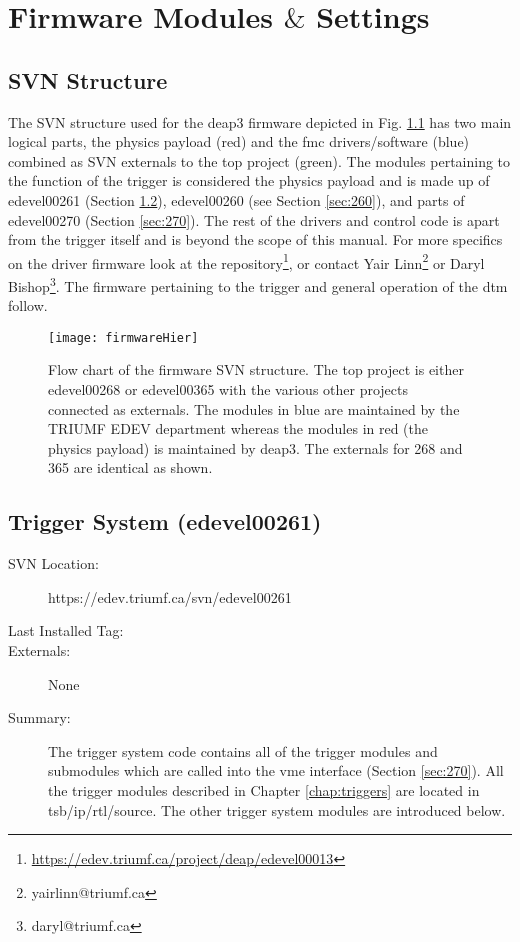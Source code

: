 \chapter{Firmware Modules $\&$ Settings}
\label{chap:firmware}

\section{SVN Structure}

The SVN structure used for the \gls{deap3} firmware depicted in Fig. \ref{Fig:firmHier} has two main logical parts, the physics payload (red) and the \gls{fmc} drivers/software (blue) combined as SVN externals to the top project (green). 
The modules pertaining to the function of the trigger is considered the physics payload and is made up of  edevel00261 (Section \ref{sec:261}), edevel00260 (see Section \ref{sec:260}), and parts of edevel00270 (Section \ref{sec:270}). 
The rest of the drivers and control code is apart from the trigger itself and is beyond the scope of this manual. 
For more specifics on the driver firmware look at the repository\footnote{\url{https://edev.triumf.ca/project/deap/edevel00013}}, or contact Yair Linn\footnote{yairlinn@triumf.ca} or Daryl Bishop\footnote{daryl@triumf.ca}. The firmware pertaining to the trigger and general operation of the \gls{dtm} follow.

\begin{landscape}
	\vspace*{\fill}
	\begin{figure}[ht]
	\centering
	\texttt{[image: firmwareHier]}
	\caption{Flow chart of the firmware SVN structure. The top project is either edevel00268 or edevel00365 with the various other projects connected as externals. The modules in blue are maintained by the TRIUMF EDEV department whereas the modules in red (the physics payload) is maintained by \gls{deap3}. The externals for 268 and 365 are identical as shown.}
	\label{Fig:firmHier}
	\end{figure}
	\vspace*{\fill}
\end{landscape}


\section{Trigger System (edevel00261)}
\label{sec:261}
\begin{description}
\item[SVN Location:] https://edev.triumf.ca/svn/edevel00261
\item[Last Installed Tag:] \tagTwoSixOne %
\item[Externals:] None
\item[Summary:] The trigger system code contains all of the trigger modules and submodules which are called into the \gls{vme} interface (Section \ref{sec:270}). All the trigger modules described in Chapter \ref{chap:triggers} are located in tsb/ip/rtl/source. The other trigger system modules are introduced below.
\end{description}
	

